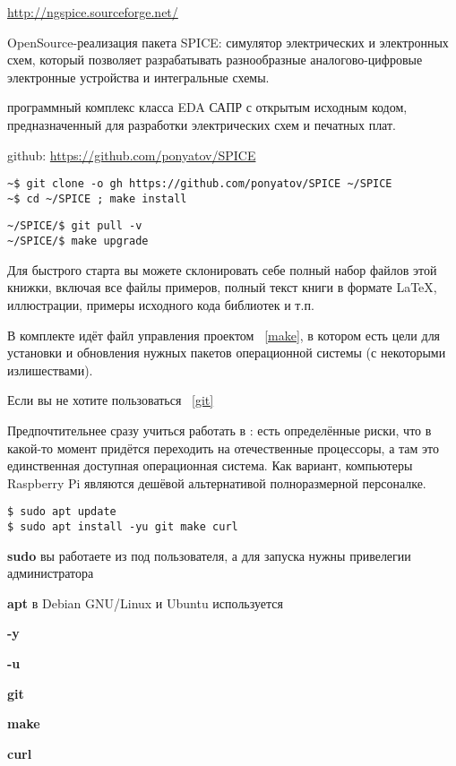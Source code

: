 \clearpage
{}

\subsecly{\ngs}

\url{http://ngspice.sourceforge.net/}

\medskip\noindent
OpenSource-реализация пакета SPICE: симулятор электрических и электронных схем,
который позволяет разрабатывать разнообразные аналогово-цифровые электронные
устройства и интегральные схемы.

\subsecly{\ki}

\noindent
программный комплекс класса EDA САПР с открытым исходным кодом, предназначенный
для разработки электрических схем и печатных плат.


github: \url{https://github.com/ponyatov/SPICE}

\begin{verbatim}
~$ git clone -o gh https://github.com/ponyatov/SPICE ~/SPICE
~$ cd ~/SPICE ; make install
\end{verbatim}
\begin{verbatim}
~/SPICE/$ git pull -v
~/SPICE/$ make upgrade
\end{verbatim}

\noindent
Для быстрого старта вы можете склонировать себе полный набор файлов этой книжки,
включая все файлы примеров, полный текст книги в формате \LaTeX, иллюстрации,
примеры исходного кода библиотек и т.п.

В комплекте идёт файл управления проектом \mkf\ \ref{make}, в котором есть цели
для установки и обновления нужных пакетов операционной системы (с некоторыми
излишествами).

\clearpage
Если вы не хотите пользоваться \git\ \ref{git}

\subsecly{\linux}

\noindent
Предпочтительнее сразу учиться работать в \linux: есть определённые риски, что в
какой-то момент придётся переходить на отечественные процессоры, а там это
единственная доступная операционная система. Как вариант, компьютеры Raspberry Pi являются дешёвой
альтернативой полноразмерной персоналке.

\begin{verbatim}
$ sudo apt update
$ sudo apt install -yu git make curl
\end{verbatim}

\begin{description}[nosep]
\item{\textbf{sudo}} вы работаете из под пользователя, а для запуска
                     нужны привелегии администратора
\item{\textbf{apt}} в Debian GNU/Linux и Ubuntu используется 
\item{\textbf{-y}
}\item{\textbf{-u}
}\item{\textbf{git}}
\item{\textbf{make}}
\item{\textbf{curl}}
\end{description}

\subsecly{\win}
